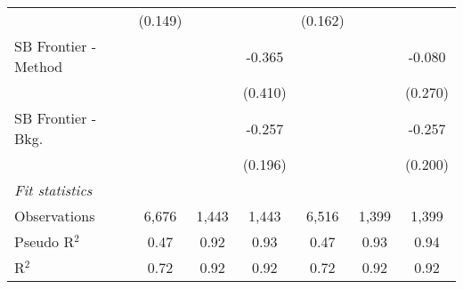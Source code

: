\begin{tabular}{lcccccc}
                                & (0.149)        &               &                & (0.162)        &              &   \\   
   SB Frontier - Method         &                &               & -0.365         &                &              & -0.080\\   
                                &                &               & (0.410)        &                &              & (0.270)\\   
   SB Frontier - Bkg.           &                &               & -0.257         &                &              & -0.257\\   
                                &                &               & (0.196)        &                &              & (0.200)\\   
   \midrule
   \emph{Fit statistics}\\
   Observations                 & 6,676          & 1,443         & 1,443          & 6,516          & 1,399        & 1,399\\  
   Pseudo R$^2$                 & 0.47           & 0.92          & 0.93           & 0.47           & 0.93         & 0.94\\  
   R$^2$                        & 0.72           & 0.92          & 0.92           & 0.72           & 0.92         & 0.92\\  
   

\end{tabular}

